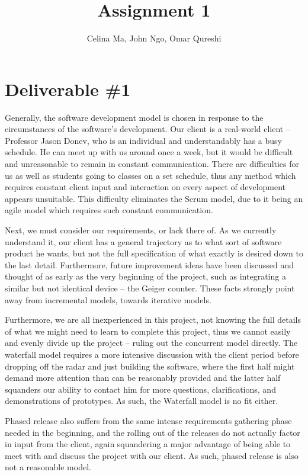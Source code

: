 \documentclass[11pt,a4paper]{article}
\title{\vspace{-2.0cm} Assignment 1}
\author{Celina Ma, John Ngo, Omar Qureshi}
\begin{document}
\maketitle

\section*{Deliverable \#1}

Generally, the software development model is chosen in response to the circumstances of the software’s development. Our client is a real-world client – Professor Jason Donev, who is an individual and understandably has a busy schedule. He can meet up with us around once a week, but it would be difficult and unreasonable to remain in constant communication. There are difficulties for us as well as students going to classes on a set schedule, thus any method which requires constant client input and interaction on every aspect of development appears unsuitable. This difficulty eliminates the Scrum model, due to it being an agile model which requires such constant communication.

Next, we must consider our requirements, or lack there of. As we currently understand it, our client has a general trajectory as to what sort of software product he wants, but not the full specification of what exactly is desired down to the last detail. Furthermore, future improvement ideas have been discussed and thought of as early as the very beginning of the project, such as integrating a similar but not identical device – the Geiger counter. These facts strongly point away from incremental models, towards iterative models. 

Furthermore, we are all inexperienced in this project, not knowing the full details of what we might need to learn to complete this project, thus we cannot easily and evenly divide up the project – ruling out the concurrent model directly. The waterfall model requires a more intensive discussion with the client period before dropping off the radar and just building the software, where the first half might demand more attention than can be reasonably provided and the latter half squanders our ability to contact him for more questions, clarifications, and demonstrations of prototypes. As such, the Waterfall model is no fit either.

Phased release also suffers from the same intense requirements gathering phase needed in the beginning, and the rolling out of the releases do not actually factor in input from the client, again squandering a major advantage of being able to meet with and discuss the project with our client. As such, phased release is also not a reasonable model.
\end{document}
